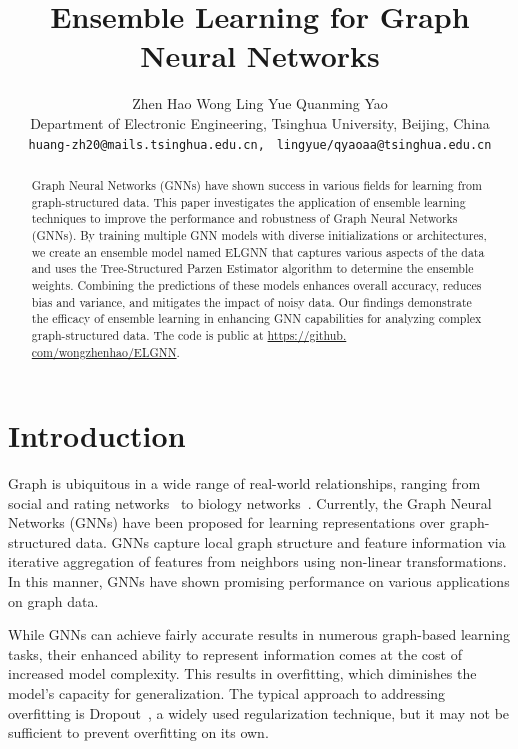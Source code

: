 \documentclass[11pt]{article}
\title{Ensemble Learning for Graph Neural Networks}
\author{Zhen Hao Wong \quad Ling Yue \quad Quanming Yao \\
	Department of Electronic Engineering, Tsinghua University, Beijing, China \\
        \texttt{\small huang-zh20@mails.tsinghua.edu.cn, }
        \texttt{\small {lingyue/qyaoaa}@tsinghua.edu.cn}
}
\begin{document}
\maketitle
\begin{abstract}
Graph Neural Networks (GNNs) have shown success in various fields for learning from graph-structured data. 
    This paper investigates the application of ensemble learning techniques to improve the performance and robustness of Graph Neural Networks (GNNs). 
    By training multiple GNN models with diverse initializations or architectures, 
    we create an ensemble model named ELGNN that captures various aspects of the data and 
    uses the Tree-Structured Parzen Estimator algorithm to determine the ensemble weights. 
    Combining the predictions of these models enhances overall accuracy, 
    reduces bias and variance, and mitigates the impact of noisy data. 
    Our findings demonstrate the efficacy of ensemble learning in enhancing GNN capabilities for analyzing complex graph-structured data. 
    The code is public at \url{https://github. com/wongzhenhao/ELGNN}. 
\end{abstract}

\section{Introduction}

Graph is ubiquitous in a wide range of real-world relationships, ranging from social and rating networks~\cite{newman2002random} to biology networks~\cite{gilmer2017neural}. Currently, the Graph Neural Networks (GNNs)  have been proposed for learning representations over graph-structured
data. GNNs capture local graph structure and feature information via iterative aggregation of
features from neighbors using non-linear transformations. In this manner, GNNs have shown
promising performance on various applications on graph data. 

While GNNs can achieve fairly accurate results in numerous graph-based learning tasks, their enhanced ability to represent information comes at the cost of increased model complexity. This results in overfitting, which diminishes the model's capacity for generalization. The typical approach to addressing overfitting is Dropout~\cite{srivastava2014dropout}, a widely used regularization technique, but it may not be sufficient to prevent overfitting on its own. 
\end{document}
